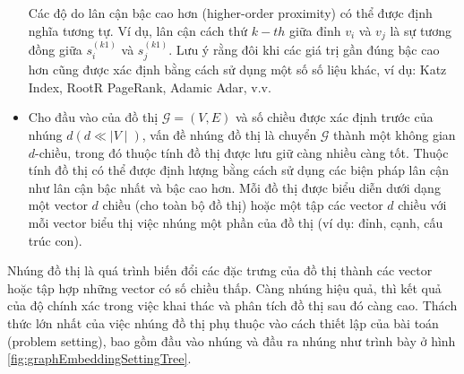 \begin{itemize}
	Các độ do lân cận bậc cao hơn (higher-order proximity) có thể được định nghĩa tương tự. Ví dụ, lân cận cách thứ $k-th$ giữa đỉnh $v_i$ và $v_j$ là sự tương đồng giữa $s^{(k 1)}_i$ và $s^{(k 1)}_j$. Lưu ý rằng đôi khi các giá trị gần đúng bậc cao hơn cũng được xác định bằng cách sử dụng một số số liệu khác, ví dụ: Katz Index, RootR PageRank, Adamic Adar, v.v.
	
	\item
	\begin{definition}\label{def:graphEmbedding}
		Cho đầu vào của đồ thị \(\mathcal{G} = (V, E)\) và số chiều được xác định trước của nhúng $d (d \ll \mid V \mid)$, vấn đề nhúng đồ thị là chuyển $\mathcal{G}$ thành một không gian \(d\)-chiều, trong đó thuộc tính đồ thị được lưu giữ càng nhiều càng tốt. Thuộc tính đồ thị có thể được định lượng bằng cách sử dụng các biện pháp lân cận như lân cận bậc nhất và bậc cao hơn. Mỗi đồ thị được biểu diễn dưới dạng một vector $d$ chiều (cho toàn bộ đồ thị) hoặc một tập các vector $d$ chiều với mỗi vector biểu thị việc nhúng một phần của đồ thị (ví dụ: đỉnh, cạnh, cấu trúc con).
	\end{definition}
	
\end{itemize}

Nhúng đồ thị là quá trình biến đổi các đặc trưng của đồ thị thành các vector hoặc tập hợp những vector có số chiều thấp. Càng nhúng hiệu quả, thì kết quả của độ chính xác trong việc khai thác và phân tích đồ thị sau đó càng cao. Thách thức lớn nhất của việc nhúng đồ thị phụ thuộc vào cách thiết lập của bài toán (problem setting), bao gồm đầu vào nhúng và đầu ra nhúng như trình bày ở hình \ref{fig:graphEmbeddingSettingTree}.

